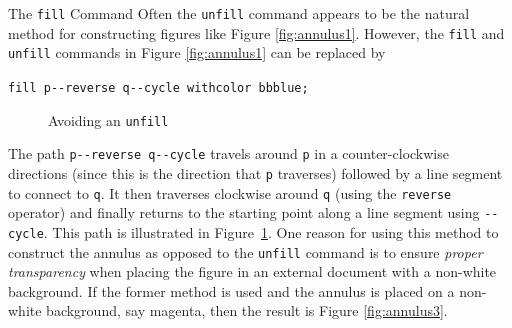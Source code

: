 \begin{subsection}{The \texttt{fill} Command}
Often the \texttt{unfill} command appears to be the natural method for constructing figures like Figure \ref{fig:annulus1}.  However, the \texttt{fill} and \texttt{unfill} commands in Figure \ref{fig:annulus1} can be replaced by \begin{center}\verb|fill p--reverse q--cycle withcolor bbblue;|\end{center}
\begin{figure}[t]
	\begin{center}\end{center}
	\caption{Avoiding an \texttt{unfill}}\label{fig:annulus2}
\end{figure}
The path \verb|p--reverse q--cycle| travels around \texttt{p} in a counter-clockwise directions (since this is the direction that \texttt{p} traverses) followed by a line segment to connect to \texttt{q}.  It then traverses clockwise around \texttt{q} (using the \texttt{reverse} operator) and finally returns to the starting point along a line segment using \texttt{-{}-cycle}.  This path is illustrated in Figure~\ref{fig:annulus2}.  One reason for using this method to construct the annulus as opposed to the \texttt{unfill} command is to ensure \textit{proper transparency} when placing the figure in an external document with a non-white background.  If the former method is used and the annulus is placed on a non-white background, say magenta, then the result is Figure \ref{fig:annulus3}.
\begin{figure}[ht]
	\begin{center}\end{center}

\end{figure}
\end{subsection}
